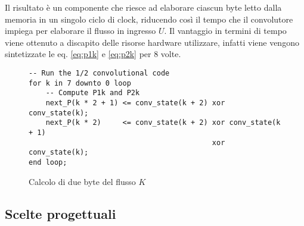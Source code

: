 Il risultato è un componente che riesce ad elaborare ciascun byte letto dalla memoria in un singolo ciclo di clock, riducendo così il tempo che il convolutore impiega per elaborare il flusso in ingresso $U$. Il vantaggio in termini di tempo viene ottenuto a discapito delle risorse hardware utilizzare, infatti viene vengono sintetizzate le eq. \ref{eq:p1k} e \ref{eq:p2k} per 8 volte.

\begin{figure}[!ht]
    \centering
    \begin{varwidth}{\linewidth}
        \begin{verbatim}
-- Run the 1/2 convolutional code
for k in 7 downto 0 loop
    -- Compute P1k and P2k
    next_P(k * 2 + 1) <= conv_state(k + 2) xor conv_state(k);
    next_P(k * 2)     <= conv_state(k + 2) xor conv_state(k + 1)
                                           xor conv_state(k);
end loop;
    \end{verbatim}
    \end{varwidth}
    \caption{Calcolo di due byte del flusso $K$}
    \label{code:calcolop}
\end{figure}

\subsection{Scelte progettuali}